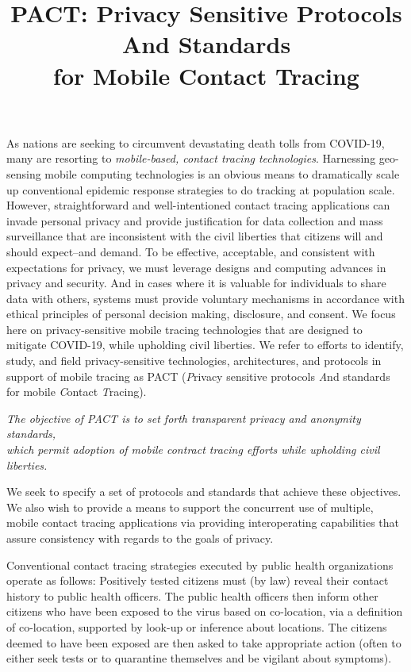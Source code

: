 \documentclass{article}
\title{{\Huge PACT\/}:   {\Huge P\/}rivacy Sensitive Protocols {\Huge A\/}nd Standards\\
for Mobile {\Huge C\/}ontact {\Huge T\/}racing }
\date{}
\begin{document}
\maketitle

As nations are seeking to circumvent devastating death tolls from COVID-19, many are resorting to \emph{mobile-based, contact tracing technologies}. Harnessing geo-sensing mobile computing technologies
is an obvious means to dramatically scale up conventional epidemic response strategies
to do tracking at population scale. However, straightforward and well-intentioned contact tracing applications can invade personal privacy and provide justification for data collection and mass surveillance that are inconsistent with the civil liberties that citizens will and should expect--and demand. To be effective, acceptable, and consistent with expectations for privacy, we must leverage designs and computing advances in privacy and security. And in cases where it is valuable for individuals to share data with others, systems must provide voluntary mechanisms in accordance with ethical principles of personal decision making, disclosure, and consent. We focus here on privacy-sensitive mobile tracing technologies that are designed to mitigate COVID-19, while upholding civil liberties.  We refer to efforts to identify, study, and field  privacy-sensitive technologies, architectures, and protocols in support of mobile tracing as PACT (\emph{P}rivacy sensitive protocols \emph{A}nd standards for mobile \emph{C}ontact \emph{T}racing).

\begin{center}
\emph{The objective of PACT is to set forth transparent privacy and
  anonymity standards,\\
  which permit adoption of mobile contract tracing efforts while upholding civil liberties.}
\end{center}

We seek to specify a set of protocols and standards that achieve
these objectives. We also wish to provide a means to support the concurrent use of multiple, mobile contact tracing applications via providing interoperating capabilities that assure consistency with regards to the goals of privacy.

Conventional contact tracing strategies executed by public health organizations operate as follows: Positively tested citizens must (by law) reveal their contact history to public health officers. The public health officers then inform other citizens who have been exposed to the virus based on co-location, via a definition of co-location, supported by look-up or inference about locations. The citizens deemed to have been exposed are then asked to take appropriate action (often to either seek tests or to quarantine
themselves and be vigilant about symptoms).  
\end{document}
